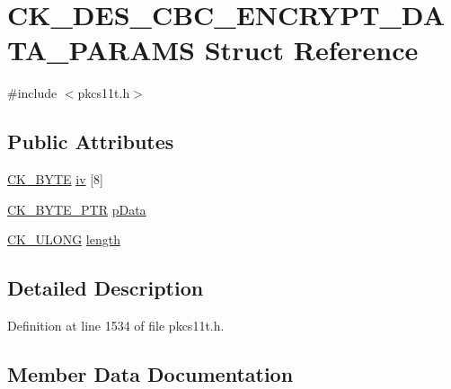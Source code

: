 \hypertarget{struct_c_k___d_e_s___c_b_c___e_n_c_r_y_p_t___d_a_t_a___p_a_r_a_m_s}{}\section{C\+K\+\_\+\+D\+E\+S\+\_\+\+C\+B\+C\+\_\+\+E\+N\+C\+R\+Y\+P\+T\+\_\+\+D\+A\+T\+A\+\_\+\+P\+A\+R\+A\+MS Struct Reference}
\label{struct_c_k___d_e_s___c_b_c___e_n_c_r_y_p_t___d_a_t_a___p_a_r_a_m_s}


{\ttfamily \#include $<$pkcs11t.\+h$>$}

\subsection*{Public Attributes}
\begin{DoxyCompactItemize}
\item 
\hyperlink{pkcs11t_8h_a51e605f881c86838bf12d70707b57b85}{C\+K\+\_\+\+B\+Y\+TE} \hyperlink{struct_c_k___d_e_s___c_b_c___e_n_c_r_y_p_t___d_a_t_a___p_a_r_a_m_s_a2439d83107218803cd1ef0caa1209030}{iv} \mbox{[}8\mbox{]}
\item 
\hyperlink{pkcs11t_8h_a3d7233a4077fbaf7ae76b64da0a62a21}{C\+K\+\_\+\+B\+Y\+T\+E\+\_\+\+P\+TR} \hyperlink{struct_c_k___d_e_s___c_b_c___e_n_c_r_y_p_t___d_a_t_a___p_a_r_a_m_s_a343416d1be041ad6640040f910083699}{p\+Data}
\item 
\hyperlink{pkcs11t_8h_a35181858a3b7a0a81f49d180d8f446ef}{C\+K\+\_\+\+U\+L\+O\+NG} \hyperlink{struct_c_k___d_e_s___c_b_c___e_n_c_r_y_p_t___d_a_t_a___p_a_r_a_m_s_a407028625b00e4fbf76208d8216197f3}{length}
\end{DoxyCompactItemize}


\subsection{Detailed Description}


Definition at line 1534 of file pkcs11t.\+h.



\subsection{Member Data Documentation}
\mbox{\label{struct_c_k___d_e_s___c_b_c___e_n_c_r_y_p_t___d_a_t_a___p_a_r_a_m_s_a2439d83107218803cd1ef0caa1209030}} 
